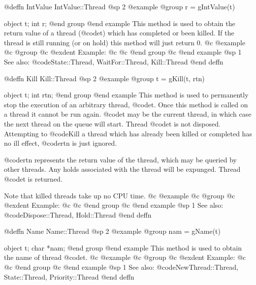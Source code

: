 @deffn {IntValue} IntValue::Thread
@sp 2
@example
@group
r = gIntValue(t)

object  t;
int     r;
@end group
@end example
This method is used to obtain the return value of a thread (@code{t})
which has completed or been killed.  If the thread is still running
(or on hold) this method will just return 0.
@c @example
@c @group
@c @exdent Example:
@c 
@c @end group
@c @end example
@sp 1
See also:  @code{State::Thread, WaitFor::Thread, Kill::Thread}
@end deffn















@deffn {Kill} Kill::Thread
@sp 2
@example
@group
t = gKill(t, rtn)

object  t;
int     rtn;
@end group
@end example
This method is used to permanently stop the execution of an arbitrary
thread, @code{t}.  Once this method is called on a thread it cannot
be run again.  @code{t} may be the current thread, in which case the
next thread on the queue will start.  Thread @code{t} is not disposed.
Attempting to @code{Kill} a thread which has already been killed or
completed has no ill effect, @code{rtn} is just ignored.

@code{rtn} represents the return value of the thread, which may be
queried by other threads.  Any holds associated with the thread
will be expunged.  Thread @code{t} is returned.

Note that killed threads take up no CPU time.
@c @example
@c @group
@c @exdent Example:
@c 
@c @end group
@c @end example
@sp 1
See also:  @code{Dispose::Thread, Hold::Thread}
@end deffn








@deffn {Name} Name::Thread
@sp 2
@example
@group
nam = gName(t)

object  t;
char    *nam;
@end group
@end example
This method is used to obtain the name of thread @code{t}.
@c @example
@c @group
@c @exdent Example:
@c 
@c @end group
@c @end example
@sp 1
See also:  @code{NewThread::Thread, State::Thread, Priority::Thread}
@end deffn












